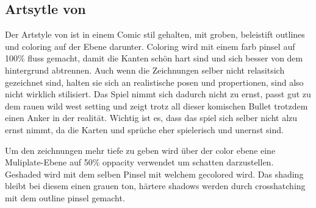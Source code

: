 \subsection{Artsytle von \FF}\label{subsec:references}

Der Artstyle von \FF ist in einem Comic stil gehalten, mit groben, beleistift outlines und coloring auf der Ebene darunter.
Coloring wird mit einem farb pinsel auf 100\% fluss gemacht, damit die Kanten schön hart sind und sich besser von dem hintergrund abtrennen.
Auch wenn die Zeichnungen selber nicht relasitsich gezeichnet sind, halten sie sich an realistische posen und propertionen, sind also nicht wirklich stilisiert.
Das Spiel nimmt sich dadurch nicht zu ernst, passt gut zu dem rauen wild west setting und zeigt trotz all dieser komischen Bullet
trotzdem einen Anker in der realität. Wichtig ist es, dass das spiel sich selber nicht alzu ernst nimmt, da die Karten und sprüche eher
spielerisch und unernst sind.

Um den zeichnungen mehr tiefe zu geben wird über der color ebene eine Muliplate-Ebene auf 50\% oppacity verwendet um schatten
darzustellen. Geshaded wird mit dem selben Pinsel mit welchem gecolored wird. Das shading bleibt bei diesem einen grauen ton,
härtere shadows werden durch crosshatching mit dem outline pinsel gemacht.

%


%

\renewcommand{\kapitelautor}{}

